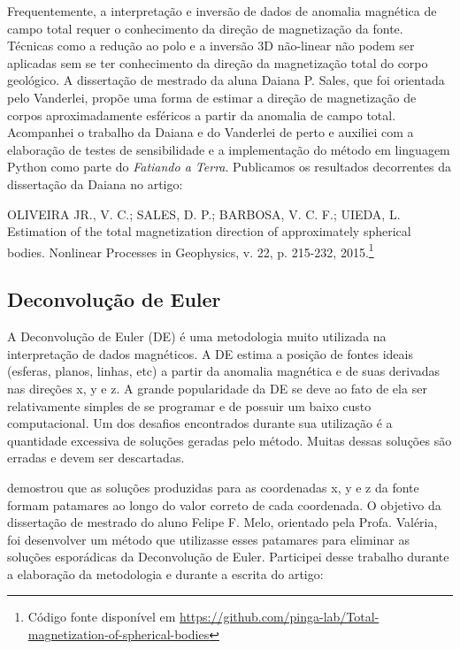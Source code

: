 \documentclass[12pt,a4paper,oneside,titlepage,onecolumn]{article}
\begin{document}
Frequentemente, a interpretação e inversão de dados de anomalia magnética de
campo total requer o conhecimento da direção de magnetização da fonte.
Técnicas como a redução ao polo e a inversão 3D não-linear não podem ser
aplicadas sem se ter conhecimento da direção da magnetização total do corpo
geológico.
A dissertação de mestrado da aluna Daiana P. Sales, que foi orientada pelo
Vanderlei, propõe uma forma de estimar a direção de magnetização de corpos
aproximadamente esféricos a partir da anomalia de campo total.
Acompanhei o trabalho da Daiana e do Vanderlei de perto e auxiliei com a
elaboração de testes de sensibilidade e a implementação do método em linguagem
Python como parte do \textit{Fatiando a Terra}.
Publicamos os resultados decorrentes da dissertação da Daiana no artigo:

\begin{displayquote}
    OLIVEIRA JR., V. C.; SALES, D. P.; BARBOSA, V. C. F.; UIEDA, L. Estimation
    of the total magnetization direction of approximately spherical bodies.
    Nonlinear Processes in Geophysics, v. 22, p. 215-232, 2015.\footnote{Código
    fonte disponível em
    \url{https://github.com/pinga-lab/Total-magnetization-of-spherical-bodies}}
\end{displayquote}



\subsection{Deconvolução de Euler}

A Deconvolução de Euler (DE) \citep{thompson1982,reid1990} é uma metodologia
muito utilizada na interpretação de dados magnéticos.
A DE estima a posição de fontes ideais (esferas, planos, linhas, etc)
a partir da anomalia magnética e de suas derivadas nas direções x, y e z.
A grande popularidade da DE se deve ao fato de ela ser relativamente simples de
se programar e de possuir um baixo custo computacional.
Um dos desafios encontrados durante sua utilização é a quantidade excessiva de
soluções geradas pelo método.
Muitas dessas soluções são erradas e devem ser descartadas.

\citet{barbosa1999} demostrou que as soluções produzidas para as coordenadas x,
y e z da fonte formam patamares ao longo do valor correto de cada coordenada.
O objetivo da dissertação de mestrado do aluno Felipe F. Melo, orientado pela
Profa. Valéria, foi desenvolver um método que utilizasse esses patamares para
eliminar as soluções esporádicas da Deconvolução de Euler.
Participei desse trabalho durante a elaboração da metodologia e durante a
escrita do artigo:
\end{document}
